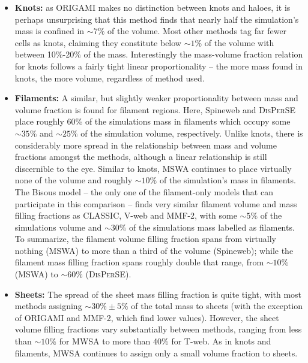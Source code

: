 \documentclass[useAMS,usenatbib]{mnras}
\newcommand{\bisous}{Bisous}
\newcommand{\classic}{\textsc{CLASSIC}}
\newcommand{\disperse}{\textsc{DisPerSE}}
\newcommand{\origami}{\textsc{ORIGAMI}}
\newcommand{\vweb}{V-web}
\newcommand{\mswa}{\textsc{MSWA}}
\newcommand{\mmft}{\textsc{MMF-2}}
\newcommand{\spine}{Spineweb}
\begin{document}
\begin{itemize} 
\item {\bf Knots:} as \origami{} makes no distinction between knots and haloes, it is perhaps unsurprising that this method finds that nearly half the simulation's mass is confined in $\sim7\%$ of the volume. %
Most other methods tag far fewer cells as knots, claiming they constitute below $\sim1\%$ of the volume with between 10\%-20\% of the mass. Interestingly the mass-volume fraction relation for knots follows a fairly tight linear proportionality -- the more mass found in knots, the more volume, regardless of method used. 
\item {\bf Filaments:} A similar, but slightly weaker proportionality between mass and volume fraction is found for filament regions. Here, \spine{} and \disperse{} place roughly 60\% of the simulations mass in filaments which occupy some $\sim35\%$ and $\sim25\%$ of the simulation volume, respectively. Unlike knots, there is considerably more spread in the relationship between mass and volume fractions amongst the methods, although a linear relationship is still discernible to the eye. Similar to knots, \mswa{} continues to place virtually none of the volume and roughly $\sim10\%$ of the simulation's mass in filaments. The \bisous{} model -- the only one of the filament-only models that can participate in this comparison -- finds very similar filament volume and mass filling fractions as \classic{},  \vweb{} and \mmft{}, with some $\sim5\%$ of the simulations volume and $\sim30\%$ of the simulations mass labelled as filaments. To summarize, the filament volume filling fraction spans from virtually nothing (\mswa{}) to more than a third of the volume (\spine{}); while the filament mass filling fraction spans roughly double that range, from $\sim10\%$ (\mswa{}) to $\sim60\%$ (\disperse{}).
\item {\bf Sheets:} The spread of the sheet mass filling fraction is quite tight, with most methods assigning $\sim30\%\pm5\%$ of the total mass to sheets (with the exception of \origami{} and \mmft{}, which find lower values). However, the sheet volume filling fractions vary substantially between methods, ranging from less than $\sim10\%$ for MWSA to more than 40\% for T-web. As in knots and filaments, MWSA continues to assign only a small volume fraction to sheets.

\end{itemize}
\end{document}
